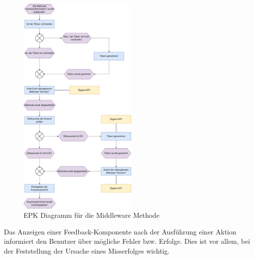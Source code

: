 \begin{figure}[h]
\centering
\includegraphics[width=0.52\textwidth]{FLUTTER/images/GP/MiddlewareEPK.png}
\caption{EPK Diagramm für die Middleware Methode}
\end{figure}

\newpage
{}\label{feedbackdialog}

Das Anzeigen einer Feedback-Komponente nach der Ausführung einer Aktion informiert den Benutzer über mögliche Fehler bzw. Erfolge. Dies ist vor allem, bei der Feststellung der Ursache eines Misserfolges wichtig.

